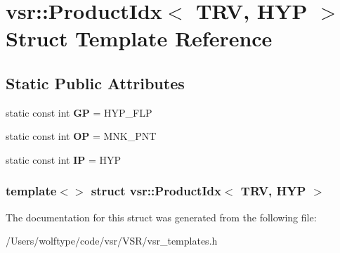 \hypertarget{structvsr_1_1_product_idx_3_01_t_r_v_00_01_h_y_p_01_4}{\section{vsr\-:\-:Product\-Idx$<$ T\-R\-V, H\-Y\-P $>$ Struct Template Reference}
\label{structvsr_1_1_product_idx_3_01_t_r_v_00_01_h_y_p_01_4}
}
\subsection*{Static Public Attributes}
\begin{DoxyCompactItemize}
\item 
\hypertarget{structvsr_1_1_product_idx_3_01_t_r_v_00_01_h_y_p_01_4_ae311aeeed0cd74418f3393b0f75abc53}{static const int {\bfseries G\-P} = H\-Y\-P\-\_\-\-F\-L\-P}\label{structvsr_1_1_product_idx_3_01_t_r_v_00_01_h_y_p_01_4_ae311aeeed0cd74418f3393b0f75abc53}

\item 
\hypertarget{structvsr_1_1_product_idx_3_01_t_r_v_00_01_h_y_p_01_4_accf70777edaa16a1c85240acb4a015c1}{static const int {\bfseries O\-P} = M\-N\-K\-\_\-\-P\-N\-T}\label{structvsr_1_1_product_idx_3_01_t_r_v_00_01_h_y_p_01_4_accf70777edaa16a1c85240acb4a015c1}

\item 
\hypertarget{structvsr_1_1_product_idx_3_01_t_r_v_00_01_h_y_p_01_4_af6339cdfdee31285fa41941fe8d50877}{static const int {\bfseries I\-P} = H\-Y\-P}\label{structvsr_1_1_product_idx_3_01_t_r_v_00_01_h_y_p_01_4_af6339cdfdee31285fa41941fe8d50877}

\end{DoxyCompactItemize}
\subsubsection*{template$<$$>$ struct vsr\-::\-Product\-Idx$<$ T\-R\-V, H\-Y\-P $>$}



The documentation for this struct was generated from the following file\-:\begin{DoxyCompactItemize}
\item 
/\-Users/wolftype/code/vsr/\-V\-S\-R/vsr\-\_\-templates.\-h\end{DoxyCompactItemize}
